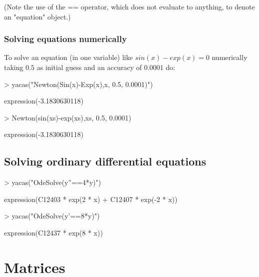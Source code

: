 \documentclass[10pt]{article}
\begin{document}
(Note the use of the == operator, which does not evaluate to anything,
to denote an "equation" object.)

\subsubsection{Solving equations numerically}
To solve an equation (in one variable) like $sin(x)-exp(x)=0$ numerically taking $0.5$
as initial guess and an accuracy of $0.0001$ do:
\begin{Schunk}
\begin{Sinput}
> yacas("Newton(Sin(x)-Exp(x),x, 0.5, 0.0001)")
\end{Sinput}
\begin{Soutput}
expression(-3.1830630118)
\end{Soutput}
\end{Schunk}

\begin{Schunk}
\begin{Sinput}
> Newton(sin(xs)-exp(xs),xs, 0.5, 0.0001)
\end{Sinput}
\begin{Soutput}
expression(-3.1830630118)
\end{Soutput}
\end{Schunk}



\subsection{Solving ordinary differential equations}

\begin{Schunk}
\begin{Sinput}
> yacas("OdeSolve(y''==4*y)")
\end{Sinput}
\begin{Soutput}
expression(C12403 * exp(2 * x) + C12407 * exp(-2 * x))
\end{Soutput}
\begin{Sinput}
> yacas("OdeSolve(y'==8*y)")
\end{Sinput}
\begin{Soutput}
expression(C12437 * exp(8 * x))
\end{Soutput}
\end{Schunk}


\section{Matrices}
\label{sec:matrices}
\end{document}
